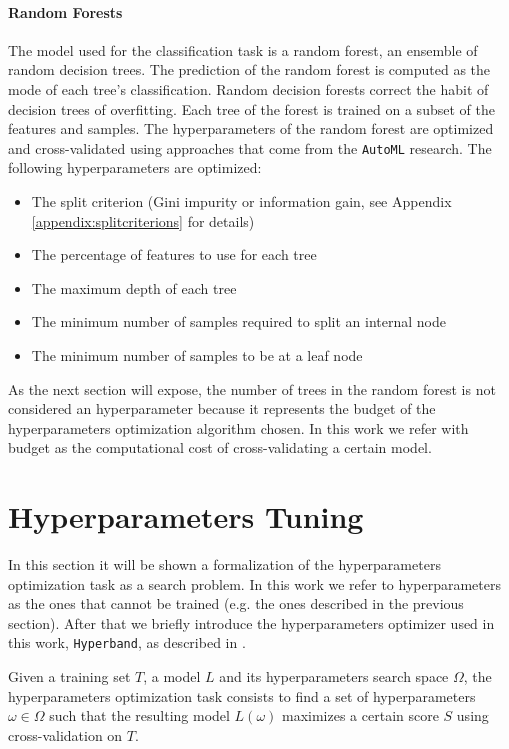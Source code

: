 \documentclass[11pt, a4paper]{article}
\begin{document}
  \paragraph{Random Forests}
    The model used for the classification task is a random forest, an ensemble of random decision trees. The prediction of the random forest is computed as the mode of each tree's classification. Random decision forests correct the habit of decision trees of overfitting. Each tree of the forest is trained on a subset of the features and samples. The hyperparameters of the random forest are optimized and cross-validated using approaches that come from the \texttt{AutoML} research. The following hyperparameters are optimized:
    \begin{itemize}
      \item The split criterion (Gini impurity or information gain, see Appendix \ref{appendix:splitcriterions} for details)
      \item The percentage of features to use for each tree
      \item The maximum depth of each tree
      \item The minimum number of samples required to split an internal node
      \item The minimum number of samples to be at a leaf node
    \end{itemize}
  As the next section will expose, the number of trees in the random forest is not considered an hyperparameter because it represents the budget of the hyperparameters optimization algorithm chosen. In this work we refer with budget as the computational cost of cross-validating a certain model.

\section{Hyperparameters Tuning}
  In this section it will be shown a formalization of the hyperparameters optimization task as a search problem. In this work we refer to hyperparameters as the ones that cannot be trained (e.g. the ones described in the previous section). After that we briefly introduce the hyperparameters optimizer used in this work, \texttt{Hyperband}, as described in \cite{hyperband}.

  Given a training set $T$, a model $L$ and its hyperparameters search space $\Omega$, the hyperparameters optimization task consists to find a set of hyperparameters $\omega \in \Omega$ such that the resulting model $L(\omega)$ maximizes a certain score $S$ using cross-validation on $T$.
\end{document}
